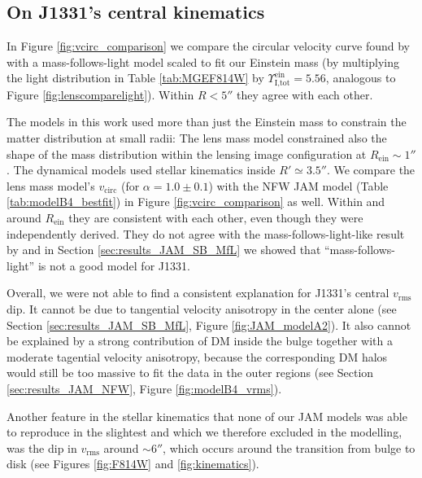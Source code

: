 \documentclass[useAMS,usenatbib]{mnras}
\begin{document}
\subsection{On J1331's central kinematics}

In Figure \ref{fig:vcirc_comparison} we compare the circular velocity curve found by \citet{SWELLSV} with a mass-follows-light model scaled to fit our Einstein mass (by multiplying the light distribution in Table \ref{tab:MGEF814W} by $\Upsilon_\text{I,tot}^\text{ein} = 5.56$, analogous to Figure \ref{fig:lenscomparelight}). Within $R < 5''$ they agree with each other. 

The models in this work used more than just the Einstein mass to constrain the matter distribution at small radii: The lens mass model constrained also the shape of the mass distribution within the lensing image configuration at $R_\text{ein} \sim 1''$. The dynamical models used stellar kinematics inside $R' \simeq 3.5''$. We compare the lens mass model's $v_\text{circ}$ (for $\alpha=1.0\pm 0.1$) with the NFW JAM model (Table \ref{tab:modelB4_bestfit}) in Figure \ref{fig:vcirc_comparison} as well. Within and around $R_\text{ein}$ they are consistent with each other, even though they were independently derived. They do not agree with the mass-follows-light-like result by \citet{SWELLSV} and in Section \ref{sec:results_JAM_SB_MfL} we showed that ``mass-follows-light'' is not a good model for J1331.

Overall, we were not able to find a consistent explanation for J1331's central $v_\text{rms}$ dip. It cannot be due to tangential velocity anisotropy in the center alone (see Section \ref{sec:results_JAM_SB_MfL}, Figure \ref{fig:JAM_modelA2}). It also cannot be explained by a strong contribution of DM inside the bulge together with a moderate tagential velocity anisotropy, because the corresponding DM halos would still be too massive to fit the data in the outer regions (see Section \ref{sec:results_JAM_NFW}, Figure \ref{fig:modelB4_vrms}).

Another feature in the stellar kinematics that none of our JAM models was able to reproduce in the slightest and which we therefore excluded in the modelling, was the dip in $v_\text{rms}$ around $\sim 6''$, which occurs around the transition from bulge to disk (see Figures \ref{fig:F814W} and \ref{fig:kinematics}).
\end{document}
